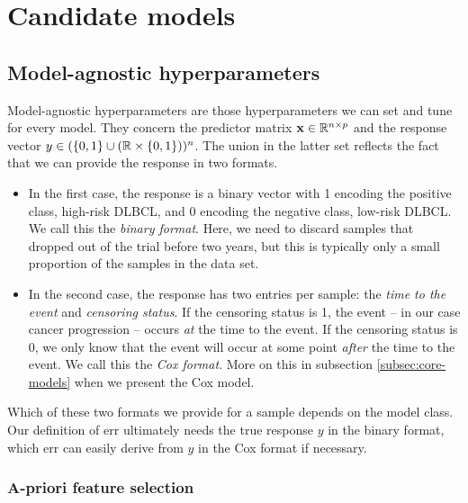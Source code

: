 \section{Candidate models}\label{sec:candidate-models}

\subsection{Model-agnostic hyperparameters}\label{subsec:model-agnostic}

Model-agnostic hyperparameters are those hyperparameters we can set and tune for every model. They 
concern the predictor matrix $\mathbf{x} \in \mathbb{R}^{n \times p}$ and the response vector $y \in 
(\{0, 1\} \cup (\mathbb{R} \times \{ 0, 1 \}))^n$. The union in the latter set reflects the fact that we
can provide the response in two formats. 
\begin{itemize}
    \item In the first case, the response is a binary vector with 1 encoding the positive class, 
        high-risk DLBCL, and 0 encoding the negative class, low-risk DLBCL. We call this the 
        \textit{binary format}. Here, we need to discard samples that dropped out of the trial 
        before two years, but this is typically only a small proportion of the samples in the data 
        set. 
    \item In the second case, the response has two entries per sample: the \textit{time to the 
        event} and \textit{censoring status}. If the censoring status is 1, the event -- in our case 
        cancer progression -- occurs \textit{at} the time to the event. If the censoring status is 
        0, 
        we only know that the event will occur at some point \textit{after} the time to the event.
        We call this the \textit{Cox format}. More on this in subsection \ref{subsec:core-models} 
        when we present the Cox model. 
\end{itemize}

Which of these two formats we provide for a sample 
depends on the model class. Our definition of $\text{err}$ ultimately needs the true response $y$ in 
the binary format, which $\text{err}$ can easily derive from $y$ in the Cox format if necessary.

\subsubsection{A-priori feature selection}

